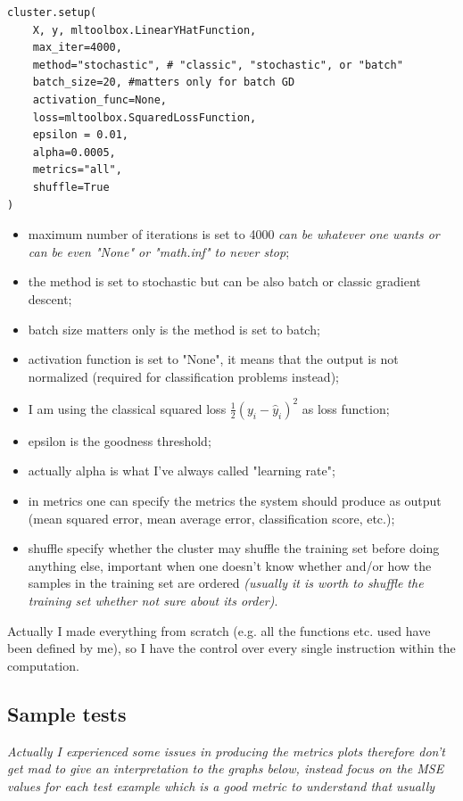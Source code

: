 \documentclass[a4paper,12pt]{article}
\theoremstyle{newplanestyle}
\theoremstyle{newdefinitionstyle}
\theoremstyle{newprovestyle}
\begin{document}
\begin{lstlisting}
cluster.setup(
    X, y, mltoolbox.LinearYHatFunction,
    max_iter=4000,
    method="stochastic", # "classic", "stochastic", or "batch"
    batch_size=20, #matters only for batch GD
    activation_func=None,
    loss=mltoolbox.SquaredLossFunction,
    epsilon = 0.01,
    alpha=0.0005,
    metrics="all",
    shuffle=True
)
\end{lstlisting}

\begin{itemize}
\item maximum number of iterations is set to 4000 \textit{can be whatever one wants or can be even "None" or "math.inf" to never stop};
\item the method is set to stochastic but can be also batch or classic gradient descent;
\item batch size matters only is the method is set to batch;
\item activation function is set to "None", it means that the output is not normalized (required for classification problems instead);
\item I am using the classical squared loss $\frac{1}{2}(y_i - \hat{y}_i)^2$ as loss function;
\item epsilon is the goodness threshold;
\item actually alpha is what I've always called "learning rate";
\item in metrics one can specify the metrics the system should produce as output (mean squared error, mean average error, classification score, etc.);
\item shuffle specify whether the cluster may shuffle the training set before doing anything else, important when one doesn't know whether and/or how the samples in the training set are ordered \textit{(usually it is worth to shuffle the training set whether not sure about its order)}.
\end{itemize}


Actually I made everything from scratch (e.g. all the functions etc. used have been defined by me), so I have the control over every single instruction within the computation.

\subsection*{Sample tests}
\textit{Actually I experienced some issues in producing the metrics plots therefore don't get mad to give an interpretation to the graphs below, instead focus on the MSE values for each test example which is a good metric to understand that usually }
\end{document}
